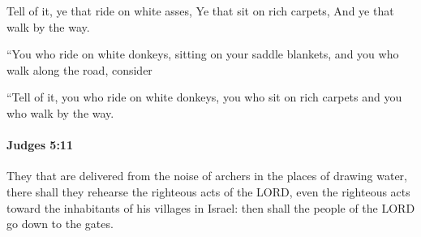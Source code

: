 			\begin{versebox}
					\item[BHS] 
					\item[ASV] Tell of it, ye that ride on white asses, Ye that sit on rich carpets, And ye that walk by the way.
					\item[NIV] “You who ride on white donkeys, sitting on your saddle blankets, and you who walk along the road, consider
					\item[NRSV] “Tell of it, you who ride on white donkeys, you who sit on rich carpets and you who walk by the way.
			\end{versebox}

		\paragraph{Judges 5:11} %
			\label{JUDGES-5-11}

			They that are delivered from the noise of archers in the places of drawing water, there shall they rehearse the righteous acts of the LORD, even the righteous acts toward the inhabitants of his villages in Israel: then shall the people of the LORD go down to the gates.

